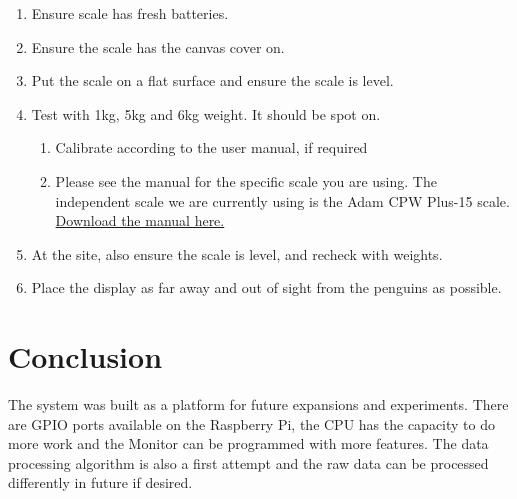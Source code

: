 \documentclass[
  letterpaper,
]{scrbook}
\begin{document}
\begin{enumerate}
\def\labelenumi{\arabic{enumi}.}
\item
  Ensure scale has fresh batteries.
\item
  Ensure the scale has the canvas cover on.
\item
  Put the scale on a flat surface and ensure the scale is level.
\item
  Test with 1kg, 5kg and 6kg weight. It should be spot on.

  \begin{enumerate}
  \def\labelenumii{\alph{enumii}.}
  \item
    Calibrate according to the user manual, if required
  \item
    Please see the manual for the specific scale you are using. The
    independent scale we are currently using is the Adam CPW Plus-15
    scale. \href{./_book/files/CPWplus_UM_USA.pdf}{Download the manual
    here.}
  \end{enumerate}
\item
  At the site, also ensure the scale is level, and recheck with weights.
\item
  Place the display as far away and out of sight from the penguins as
  possible.
\end{enumerate}

\chapter{Conclusion}\label{conclusion}

The system was built as a platform for future expansions and
experiments. There are GPIO ports available on the Raspberry Pi, the CPU
has the capacity to do more work and the Monitor can be programmed with
more features. The data processing algorithm is also a first attempt and
the raw data can be processed differently in future if desired.


\backmatter
\end{document}
